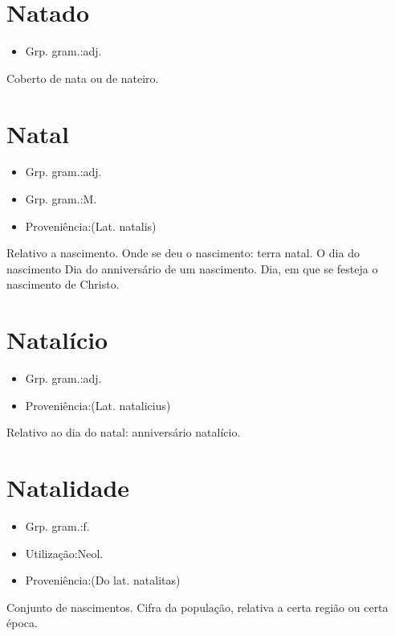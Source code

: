 \section{Natado}
\begin{itemize}
\item {Grp. gram.:adj.}
\end{itemize}
Coberto de nata ou de nateiro.
\section{Natal}
\begin{itemize}
\item {Grp. gram.:adj.}
\end{itemize}
\begin{itemize}
\item {Grp. gram.:M.}
\end{itemize}
\begin{itemize}
\item {Proveniência:(Lat. \textunderscore natalis\textunderscore )}
\end{itemize}
Relativo a nascimento.
Onde se deu o nascimento: \textunderscore terra natal\textunderscore .
O dia do nascimento
Dia do anniversário de um nascimento.
Dia, em que se festeja o nascimento de Christo.
\section{Natalício}
\begin{itemize}
\item {Grp. gram.:adj.}
\end{itemize}
\begin{itemize}
\item {Proveniência:(Lat. \textunderscore natalicius\textunderscore )}
\end{itemize}
Relativo ao dia do natal: \textunderscore anniversário natalício\textunderscore .
\section{Natalidade}
\begin{itemize}
\item {Grp. gram.:f.}
\end{itemize}
\begin{itemize}
\item {Utilização:Neol.}
\end{itemize}
\begin{itemize}
\item {Proveniência:(Do lat. \textunderscore natalitas\textunderscore )}
\end{itemize}
Conjunto de nascimentos.
Cifra da população, relativa a certa região ou certa época.
